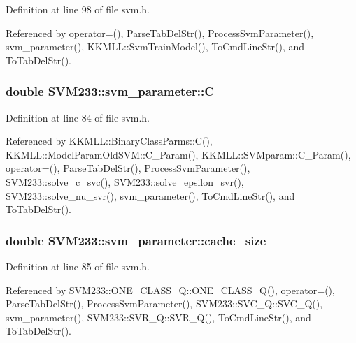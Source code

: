 Definition at line 98 of file svm.\+h.



Referenced by operator=(), Parse\+Tab\+Del\+Str(), Process\+Svm\+Parameter(), svm\+\_\+parameter(), K\+K\+M\+L\+L\+::\+Svm\+Train\+Model(), To\+Cmd\+Line\+Str(), and To\+Tab\+Del\+Str().

\subsubsection[{\texorpdfstring{C}{C}}]{\setlength{\rightskip}{0pt plus 5cm}double S\+V\+M233\+::svm\+\_\+parameter\+::C}\hypertarget{struct_s_v_m233_1_1svm__parameter_a8b864fed529218604af5affb2184b20f}{}\label{struct_s_v_m233_1_1svm__parameter_a8b864fed529218604af5affb2184b20f}


Definition at line 84 of file svm.\+h.



Referenced by K\+K\+M\+L\+L\+::\+Binary\+Class\+Parms\+::\+C(), K\+K\+M\+L\+L\+::\+Model\+Param\+Old\+S\+V\+M\+::\+C\+\_\+\+Param(), K\+K\+M\+L\+L\+::\+S\+V\+Mparam\+::\+C\+\_\+\+Param(), operator=(), Parse\+Tab\+Del\+Str(), Process\+Svm\+Parameter(), S\+V\+M233\+::solve\+\_\+c\+\_\+svc(), S\+V\+M233\+::solve\+\_\+epsilon\+\_\+svr(), S\+V\+M233\+::solve\+\_\+nu\+\_\+svr(), svm\+\_\+parameter(), To\+Cmd\+Line\+Str(), and To\+Tab\+Del\+Str().

\subsubsection[{\texorpdfstring{cache\+\_\+size}{cache_size}}]{\setlength{\rightskip}{0pt plus 5cm}double S\+V\+M233\+::svm\+\_\+parameter\+::cache\+\_\+size}\hypertarget{struct_s_v_m233_1_1svm__parameter_a38b5463e773456737b9a3c0621d75048}{}\label{struct_s_v_m233_1_1svm__parameter_a38b5463e773456737b9a3c0621d75048}


Definition at line 85 of file svm.\+h.



Referenced by S\+V\+M233\+::\+O\+N\+E\+\_\+\+C\+L\+A\+S\+S\+\_\+\+Q\+::\+O\+N\+E\+\_\+\+C\+L\+A\+S\+S\+\_\+\+Q(), operator=(), Parse\+Tab\+Del\+Str(), Process\+Svm\+Parameter(), S\+V\+M233\+::\+S\+V\+C\+\_\+\+Q\+::\+S\+V\+C\+\_\+\+Q(), svm\+\_\+parameter(), S\+V\+M233\+::\+S\+V\+R\+\_\+\+Q\+::\+S\+V\+R\+\_\+\+Q(), To\+Cmd\+Line\+Str(), and To\+Tab\+Del\+Str().

